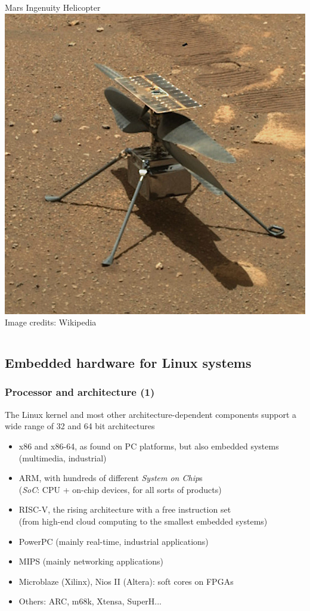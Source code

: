 \begin{frame}
\begin{columns}
  Mars Ingenuity Helicopter\\
  \includegraphics[height=0.35\textheight]{slides/sysdev-intro/mars-helicopter.jpg}\\
  \vspace{3cm}
  \tiny Image credits: Wikipedia
  \end{columns}
\end{frame}

\subsection{Embedded hardware for Linux systems}

\begin{frame}
  \frametitle{Processor and architecture (1)}
  The Linux kernel and most other architecture-dependent
  components support a wide range of 32 and 64 bit architectures
  \begin{itemize}
  \item x86 and x86-64, as found on PC platforms, but also embedded systems
    (multimedia, industrial)
  \item ARM, with hundreds of different {\em System on Chip}s\\
        ({\em SoC}: CPU + on-chip devices, for all sorts of products)
  \item RISC-V, the rising architecture with a free instruction set\\
        (from high-end cloud computing to the smallest embedded systems)
  \item PowerPC (mainly real-time, industrial applications)
  \item MIPS (mainly networking applications)
  \item Microblaze (Xilinx), Nios II (Altera): soft cores on FPGAs
  \item Others: ARC, m68k, Xtensa, SuperH...
  \end{itemize}
\end{frame}

